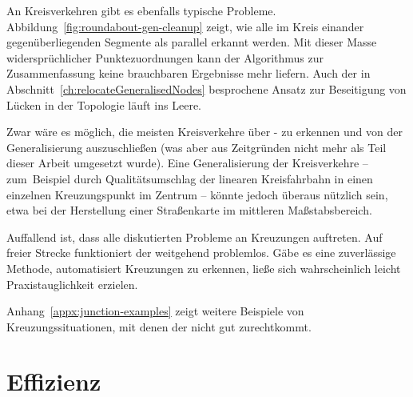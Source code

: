 \documentclass[../main/thesis.tex]{subfiles}
\begin{document}
An Kreisverkehren gibt es ebenfalls typische Probleme.
Abbildung~\ref{fig:roundabout-gen-cleanup} zeigt, wie alle im Kreis einander gegenüberliegenden Segmente als parallel erkannt werden.
Mit dieser Masse widersprüchlicher Punktezuordnungen kann der Algorithmus zur Zusammenfassung keine brauchbaren Ergebnisse mehr liefern.
Auch der in Abschnitt~\ref{ch:relocateGeneralisedNodes} besprochene Ansatz zur Beseitigung von Lücken in der Topologie läuft ins Leere.


Zwar wäre es möglich, die meisten Kreisverkehre über \osm- zu erkennen und von der Generalisierung auszuschließen (was aber aus Zeitgründen nicht mehr als Teil dieser Arbeit umgesetzt wurde).
Eine Generalisierung der Kreisverkehre -- zum~Beispiel durch Qualitätsumschlag der linearen Kreisfahrbahn in einen einzelnen Kreuzungspunkt im Zentrum -- könnte jedoch überaus nützlich sein, etwa bei der Herstellung einer Straßenkarte im mittleren Maßstabsbereich.

\newpage
Auffallend ist, dass alle diskutierten Probleme an Kreuzungen auftreten.
Auf freier Strecke funktioniert der  weitgehend problemlos.
Gäbe es eine zuverlässige Methode, automatisiert Kreuzungen zu erkennen, ließe sich wahrscheinlich leicht Praxistauglichkeit erzielen.

Anhang~\ref{appx:junction-examples} zeigt weitere Beispiele von Kreuzungssituationen, mit denen der  nicht gut zurechtkommt.



\section{Effizienz}
\label{ch:efficiency}
\end{document}
